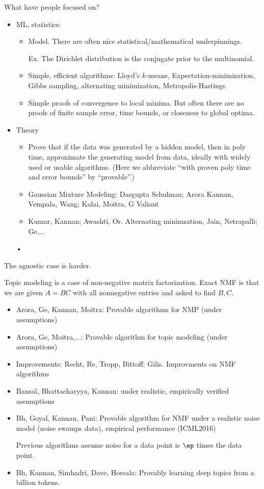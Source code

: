 What have people focused on?
\begin{itemize}
\item
ML, statistics:
\begin{itemize}
\item
Model. There are often nice statistical/mathematical underpinnings.

Ex. The Dirichlet distribution is the conjugate prior to the  multinomial.
\item
Simple, efficient algorithms: Lloyd's $k$-means, Expectation-minimization, Gibbs sampling, alternating minimization, Metropolis-Hastings
\item
Simple proofs of convergence to local minima. But often there are no proofs of finite sample error, time bounds, or closeness to global optima.
\end{itemize}
\item
Theory
\begin{itemize}
\item
Prove that if the data was generated by a hidden model, then in poly time, approximate the generating model from data, ideally with widely used or usable algorithms. (Here we abbreviate ``with proven poly time and error bounds'' by ``provable''.)
\item
Gaussian Mixture Modeling: Dasgupta Schulman; Arora Kannan, Vempala, Wang; Kalai, Moitra, G Valiant
\item
Kumar, Kannan; Awashti, Or. Alternating minimzation, Jain, Netrapalli; Ge,...
\end{itemize}•
\end{itemize}
The agnostic case is harder.

Topic modeling is a case of non-negative matrix factorization. Exact NMF is that we are given $A=BC$ with all nonnegative entries and asked to find $B,C$. 
\begin{itemize}
\item
Arora, Ge, Kannan, Moitra: Provable algorithms for NMP (under assumptions)
\item
Arora, Ge, Moitra,...: Provable algorithm for topic modeling (under assumptions)
\item
Improvements: Recht, Re, Tropp, Bittoff; Gilis. Improvments on NMF algorithms
\item
Bansal, Bhattacharyya, Kannan: under realistic, empirically verified assumptions
%
\item
Bh, Goyal, Kannan, Pani: Provable algorithm for NMF under a realistic noise model (noise swamps data), empirical performance (ICML2016)

Previous algorithms assume noise for a data point is $\ep$ times the data point.
\item
Bh, Kannan, Simhadri, Dave, Horsala: Provably learning deep topics from a billion tokens.
\end{itemize}

